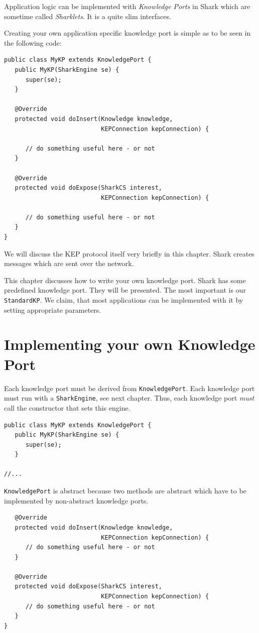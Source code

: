 Application logic can be implemented with {\it Knowledge Ports} in Shark which are sometime called {\it Sharklets}. It is a quite slim interfaces. 

Creating your own application specific knowledge port is simple as to be seen in the following code:

\begin{verbatim}
public class MyKP extends KnowledgePort {
   public MyKP(SharkEngine se) {
      super(se);
   }

   @Override
   protected void doInsert(Knowledge knowledge, 
                           KEPConnection kepConnection) {

      // do something useful here - or not
   }

   @Override
   protected void doExpose(SharkCS interest, 
                           KEPConnection kepConnection) {

      // do something useful here - or not
   }
}
\end{verbatim}

We will discuss the KEP protocol itself very briefly in this chapter. Shark creates messages which are sent over the network.

This chapter discusses how to write your own knowledge port. Shark has some predefined knowledge port. They will be presented. The most important is our {\tt StandardKP}. We claim, that most applications can be implemented with it by setting appropriate parameters. 

\section{Implementing your own Knowledge Port}
Each knowledge port must be derived from {\tt KnowledgePort}. Each knowledge port must run with a {\tt SharkEngine}, see next chapter. Thus, each knowledge port {\it must} call the constructor that sets this engine.

\begin{verbatim}
public class MyKP extends KnowledgePort {
   public MyKP(SharkEngine se) {
      super(se);
   }

//...
\end{verbatim}

{\tt KnowledgePort} is abstract because two methods are abstract which have to be implemented by non-abstract knowledge ports.


\begin{verbatim}
   @Override
   protected void doInsert(Knowledge knowledge, 
                           KEPConnection kepConnection) {
      // do something useful here - or not
   }

   @Override
   protected void doExpose(SharkCS interest, 
                           KEPConnection kepConnection) {
      // do something useful here - or not
   }
}
\end{verbatim}

